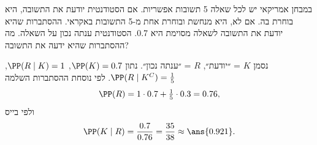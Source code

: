 במבחן אמריקאי יש לכל שאלה 5 תשובות אפשריות. אם הסטודנטית יודעת את התשובה, היא בוחרת בה. אם לא, היא מנחשת ובוחרת אחת מ-5 התשובות באקראי. ההסתברות שהיא יודעת את התשובה לשאלה מסוימת היא 0.7. הסטודנטית ענתה נכון על השאלה. מה ההסתברות שהיא ידעה את התשובה?
\begin{solbox}
נסמן $K$ = ״יודעת״, $R$ = ״ענתה נכון״. נתון $\PP(K)=0.7$, $\PP(R\mid K)=1$, $\PP(R\mid K^C)=\frac15$. לפי נוסחת ההסתברות השלמה
\[
\PP(R)=1\cdot0.7+\tfrac15\cdot0.3=0.76,
\]
ולפי בייס
\[
\PP(K\mid R)=\frac{0.7}{0.76}=\frac{35}{38}\approx\ans{0.921}.
\]
\end{solbox}
